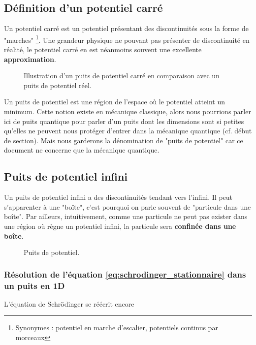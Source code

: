 \documentclass[12pt, a4paper]{book}
\begin{document}
\subsection{Définition d'un potentiel carré} \label{ch2-subsection-Definition_pot_carre}
Un potentiel carré est un potentiel présentant des discontinuités sous la forme de "marches" \footnote{Synonymes : potentiel en marche d'escalier, potentiels continus par morceaux}. Une grandeur physique ne pouvant pas présenter de discontinuité en réalité, le potentiel carré en est néanmoins souvent une excellente \textbf{approximation}.

\begin{figure}[h]
\centering
\scalebox{1}{}
\caption{Illustration d'un puits de potentiel carré en comparaison avec un puits de potentiel réel.}
\label{fig:potentiel_carre}
\end{figure}

Un puits de potentiel est une région de l'espace où le potentiel atteint un minimum. Cette notion existe en mécanique classique, alors nous pourrions parler ici de puits quantique pour parler d'un puits dont les dimensions sont si petites qu'elles ne peuvent nous protéger d'entrer dans la mécanique quantique (cf. début de section). Mais nous garderons la dénomination de "puits de potentiel" car ce document ne concerne que la mécanique quantique. \\


\subsection{Puits de potentiel infini}
Un puits de potentiel infini a des discontinuités tendant vers l'infini. Il peut s'apparenter à une "boîte", c'est pourquoi on parle souvent de "particule dans une boîte". Par ailleurs, intuitivement, comme une particule ne peut pas exister dans une région où règne un potentiel infini, la particule sera \textbf{confinée dans une boîte}.
\begin{figure}[h]
\centering
\scalebox{1}{}
\caption{Puits de potentiel.}
\label{fig:puits_potentiel}
\end{figure}
\subsubsection{Résolution de l'équation \eqref{eq:schrodinger_stationnaire} dans un puits en 1D}
L'équation de Schrödinger se réécrit encore 
\end{document}
